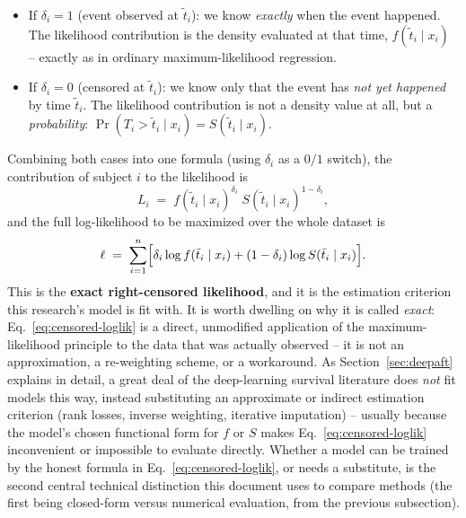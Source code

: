 \documentclass[11pt]{article}
\begin{document}
\begin{itemize}
  \item If $\delta_i = 1$ (event observed at $\tilde t_i$): we know
    \emph{exactly} when the event happened. The likelihood contribution
    is the density evaluated at that time, $f(\tilde t_i \mid x_i)$ --
    exactly as in ordinary maximum-likelihood regression.
  \item If $\delta_i = 0$ (censored at $\tilde t_i$): we know only that
    the event has \emph{not yet happened} by time $\tilde t_i$. The
    likelihood contribution is not a density value at all, but a
    \emph{probability}: $\Pr(T_i > \tilde t_i \mid x_i) = S(\tilde t_i
    \mid x_i)$.
\end{itemize}

Combining both cases into one formula (using $\delta_i$ as a $0/1$
switch), the contribution of subject $i$ to the likelihood is
\begin{equation}
  L_i \;=\; f(\tilde t_i \mid x_i)^{\delta_i}\; S(\tilde t_i \mid x_i)^{1 - \delta_i},
  \label{eq:censored-likelihood}
\end{equation}
and the full log-likelihood to be maximized over the whole dataset is
\begin{equation}
  \ell \;=\; \sum_{i=1}^n \Bigl[\delta_i \log f(\tilde t_i \mid x_i) + (1-\delta_i)\log S(\tilde t_i \mid x_i)\Bigr].
  \label{eq:censored-loglik}
\end{equation}
This is the \textbf{exact right-censored likelihood}, and it is the
estimation criterion this research's model is fit with. It is worth
dwelling on why it is called \emph{exact}: Eq.~\eqref{eq:censored-loglik}
is a direct, unmodified application of the maximum-likelihood principle
to the data that was actually observed -- it is not an approximation, a
re-weighting scheme, or a workaround. As Section~\ref{sec:deepaft}
explains in detail, a great deal of the deep-learning survival literature
does \emph{not} fit models this way, instead substituting an
approximate or indirect estimation criterion (rank losses, inverse
weighting, iterative imputation) -- usually because the model's chosen
functional form for $f$ or $S$ makes Eq.~\eqref{eq:censored-loglik}
inconvenient or impossible to evaluate directly. Whether a model can be
trained by the honest formula in Eq.~\eqref{eq:censored-loglik}, or
needs a substitute, is the second central technical distinction this
document uses to compare methods (the first being closed-form versus
numerical evaluation, from the previous subsection).
\end{document}
